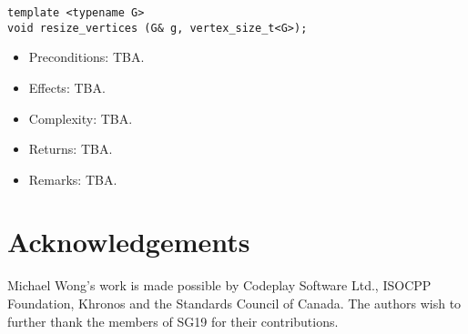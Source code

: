 \documentclass[10pt,onecolumn]{article}
\begin{document}
\begin{lstlisting}
template <typename G>
void resize_vertices (G& g, vertex_size_t<G>);
\end{lstlisting}
%
\begin{itemize}
\item Preconditions: TBA.
\item Effects: TBA.
\item Complexity: TBA.
\item Returns: TBA.
\item Remarks: TBA.
\end{itemize}

\section{Acknowledgements}
Michael Wong's work is made possible by Codeplay Software Ltd., ISOCPP Foundation, Khronos and the Standards Council of Canada.  The authors wish to further thank the members of SG19 for their contributions.

\footnotesize


\normalsize
\end{document}
